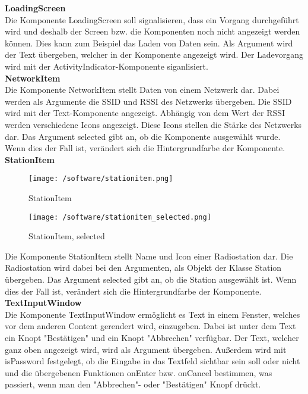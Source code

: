\documentclass[]{article}
\begin{document}
\textbf{LoadingScreen} \\
Die Komponente LoadingScreen soll signalisieren, dass ein Vorgang durchgeführt wird und deshalb der Screen bzw. die Komponenten noch nicht angezeigt werden können. Dies kann zum Beispiel das Laden von Daten sein. Als Argument wird der Text übergeben, welcher in der Komponente angezeigt wird. Der Ladevorgang wird mit der ActivityIndicator-Komponente siganlisiert. \newline \\
\textbf{NetworkItem} \\
Die Komponente NetworkItem stellt Daten von einem Netzwerk dar. Dabei werden als Argumente die SSID und RSSI des Netzwerks übergeben. Die SSID wird mit der Text-Komponente angezeigt. Abhängig von dem Wert der RSSI werden verschiedene Icons angezeigt. Diese Icons stellen die Stärke des Netzwerks dar. Das Argument selected gibt an, ob die Komponente ausgewählt wurde. Wenn dies der Fall ist, verändert sich die Hintergrundfarbe der Komponente. \newline \\
\textbf{StationItem} \\
\begin{figure}[H]
\begin{flushleft}
\texttt{[image: /software/stationitem.png]}
\caption{StationItem}
\texttt{[image: /software/stationitem\_selected.png]}
\caption{StationItem, selected}
\end{flushleft}
\end{figure}
Die Komponente StationItem stellt Name und Icon einer Radiostation dar. Die Radiostation wird dabei bei den Argumenten, als Objekt der Klasse Station übergeben. Das Argument selected gibt an, ob die Station ausgewählt ist. Wenn dies der Fall ist, verändert sich die Hintergrundfarbe der Komponente. \newline \\
\textbf{TextInputWindow} \\
Die Komponente TextInputWindow ermöglicht es Text in einem Fenster, welches vor dem anderen Content gerendert wird, einzugeben. Dabei ist unter dem Text ein Knopt "Bestätigen" und ein Knopt "Abbrechen" verfügbar. Der Text, welcher ganz oben angezeigt wird, wird als Argument übergeben. Außerdem wird mit isPassword festgelegt, ob die Eingabe in das Textfeld sichtbar sein soll oder nicht und die übergebenen Funktionen onEnter bzw. onCancel bestimmen, was passiert, wenn man den "Abbrechen"- oder "Bestätigen" Knopf drückt. \newline \\
\end{document}
